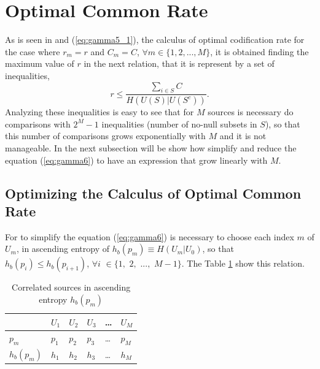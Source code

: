 \documentclass[journal]{IEEEtran}
\begin{document}
\section{Optimal Common Rate} 
\label{sec:Optimo}
As is seen in \cite{fernando} and (\ref{eq:gamma5_1}), 
the calculus of optimal codification rate for the 
case where $r_m=r$ and $C_m=C$, $\forall m \in \{1, 2, ...,M\}$, it
is obtained finding the maximum value of $r$ in the next relation, 
that it is represent by a set of inequalities,
\begin{equation}\label{eq:gamma6}
 r \leq   \frac{\sum_{i \in S}{ C}}{H(U(S)|U(S^c))}.
\end{equation}
Analyzing these inequalities is easy to see that for $M$ sources is necessary do
comparisons with $2^M-1$ inequalities (number of no-null subsets in $S$), 
so that this number of comparisons grows 
exponentially with $M$ and it is not manageable.
In the next subsection will be show how simplify and reduce the equation (\ref{eq:gamma6})
to have an expression that grow linearly  with $M$.
\subsection{Optimizing the Calculus of Optimal Common Rate} 
\label{sec:Optimizingl}

For to simplify the equation (\ref{eq:gamma6}) is necessary 
to choose each index $m$ of $U_m$, 
in ascending entropy of $h_b(p_{m})\equiv H(U_m|U_0)$, so that $h_b(p_{i}) \leq h_b(p_{i+1})$, 
$\forall i$ $\in \{1,$ $2,$ $...,$ $M-1\}$. The Table \ref{tab:1} show this relation.
\begin{table}[!hbt]
\caption{Correlated sources in ascending entropy $h_b(p_m)$}
\begin{center}
\begin{tabular}{|l |l | l | l | l |l |}
\hline
   ~       & $U_1$      & $U_2$      & $U_3$      & \dots & $U_{M}$ \\
\hline
\hline
$p_m$      & $p_1$      & $p_2$      & $p_3$      & \dots & $p_{M}$ \\
\hline
$h_b(p_m)$ & $h_1$      & $h_2$      & $h_3$      & \dots & $h_{M}$ \\
\hline
\end{tabular}
\end{center}
\label{tab:1}
\end{table}
\end{document}
